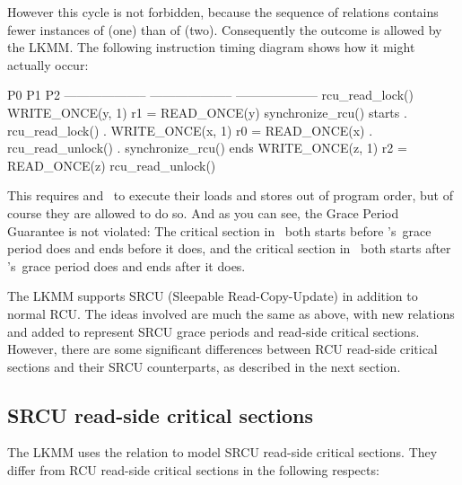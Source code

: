 However this cycle is not forbidden, because the sequence of
relations contains fewer instances of  (one) than of
 (two).
Consequently the outcome is allowed by the LKMM\@.
The following instruction timing diagram shows how it might actually
occur:

\begin{VerbatimU}
P0                      P1                      P2
--------------------    --------------------    --------------------
rcu_read_lock()
WRITE_ONCE(y, 1)
                        r1 = READ_ONCE(y)
                        synchronize_rcu() starts
                        .                       rcu_read_lock()
                        .                       WRITE_ONCE(x, 1)
r0 = READ_ONCE(x)       .
rcu_read_unlock()       .
                        synchronize_rcu() ends
                        WRITE_ONCE(z, 1)
                                                r2 = READ_ONCE(z)
                                                rcu_read_unlock()
\end{VerbatimU}

This requires  and~ to execute their loads and stores out of
program order, but of course they are allowed to do so.
And as you can see, the Grace Period Guarantee is not violated:
The critical section in~ both starts before 's~grace
period does and ends before it does, and the critical section in~
both starts after 's~grace period does and ends after it does.

The LKMM supports SRCU (Sleepable Read-Copy-Update) in addition to
normal RCU\@.
The ideas involved are much the same as above, with new
relations  and  added to represent SRCU
grace periods and read-side critical sections.
However, there are some significant differences between RCU read-side
critical sections and their SRCU counterparts, as described in the
next section.


\subsection{SRCU read-side critical sections}
\label{sec:docs:explanation:SRCU read-side critical sections}

The LKMM uses the  relation to model SRCU read-side critical
sections.
They differ from RCU read-side critical sections in the following respects:

